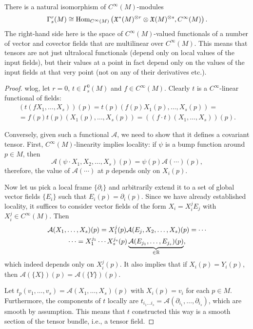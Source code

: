 \begin{thm}\label{thm tensor characterization}
    There is a natural isomorphism of $C^\infty (M)$-modules
    \[
    \Gamma^r_s(M)\cong \operatorname{Hom}_{C^\infty(M)}\left( \mathfrak{X}^\ast(M)^{\otimes r}\otimes \mathfrak{X}(M)^{\otimes s},C^\infty(M)\right).
    \]
    The right-hand side here is the space of $C^\infty(M)$-valued functionals of a number of vector and covector fields that are multilinear over $C^\infty(M)$. This means that tensors are not just ultralocal functionals (depend only on local values of the input fields), but their values at a point in fact depend only on the values of the input fields at that very point (not on any of their derivatives etc.).
\end{thm}
\begin{proof}
    \gls{wlog}, let $r=0$, $t\in \Gamma^0_s(M)$ and $f\in C^\infty (M)$. Clearly $t$ is a $C^\infty$-linear functional of fields:
    \begin{multline}
         (t(fX_1,\ldots,X_s))(p)=t(p)(f(p)X_1(p),\ldots,X_s(p))=\\=f(p)t(p)(X_1(p),\ldots,X_s(p))=((f\cdot t)(X_1,\ldots,X_s))(p).
    \end{multline}

    Conversely, given such a functional $\mathcal{A}$, we need to show that it defines a covariant tensor. First, $C^\infty(M)$-linearity implies locality: if $\psi$ is a bump function around $p\in M$, then \[\mathcal{A}(\psi\cdot X_1,X_2,\ldots, X_s)(p)=\psi(p)\mathcal{A}(\cdots)(p),\] therefore, the value of $\mathcal{A}(\cdots)$ at $p$ depends only on $X_i(p)$.

    Now let us pick a local frame $\{\partial_i\}$ and arbitrarily extend it to a set of global vector fields $\{E_i\}$ such that $E_i(p)=\partial_i(p)$. Since we have already established locality, it suffices to consider vector fields of the form $X_i=X^j_i E_j$ with $X^j_i\in C^\infty(M)$. Then
    \begin{multline}
        \mathcal{A}(X_1,\ldots,X_s)(p)=X^j_1(p)\mathcal{A}(E_j,X_2,\ldots,X_s)(p)=\cdots\\ \cdots=X_1^{j_1}\cdots X_s^{j_s}(p)\underbrace{\mathcal{A}(E_{j_1},\ldots,E_{j_s})(p)}_{\in\mathbb{R} },
    \end{multline}
    which indeed depends only on $X_i^j(p)$. It also implies that if $X_i(p)=Y_i(p)$, then $\mathcal{A}(\{X\})(p)=\mathcal{A}(\{Y\})(p)$.

    Let $t_p (v_1,\ldots,v_s)=\mathcal{A}(X_1,\ldots,X_s)(p)$ with $X_i(p)=v_i$ for each $p\in M$. Furthermore, the components of $t$ locally are $t_{i_1\ldots i_s}=\mathcal{A}(\partial_{i_1},\ldots,\partial_{i_s})$, which are smooth by assumption. This means that $t$ constructed this way is a smooth section of the tensor bundle, i.e., a tensor field.
\end{proof}

